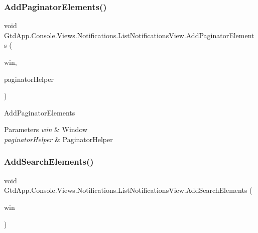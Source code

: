 \subsubsection{\texorpdfstring{Add\+Paginator\+Elements()}{AddPaginatorElements()}}
{\footnotesize\ttfamily void Gtd\+App.\+Console.\+Views.\+Notifications.\+List\+Notifications\+View.\+Add\+Paginator\+Elements (\begin{DoxyParamCaption}\item[{Window}]{win,  }\item[{\mbox{\hyperlink{class_gtd_app_1_1_console_core_1_1_views_1_1_helpers_1_1_paginator_helper}{Paginator\+Helper}}}]{paginator\+Helper }\end{DoxyParamCaption})\hspace{0.3cm}{\ttfamily [protected]}}



Add\+Paginator\+Elements 


\begin{DoxyParams}{Parameters}
{\em win} & Window\\
\hline
{\em paginator\+Helper} & Paginator\+Helper\\
\hline
\end{DoxyParams}
\mbox{\label{class_gtd_app_1_1_console_1_1_views_1_1_notifications_1_1_list_notifications_view_a9282b5c50f46f8a501f05420b8920e9e}} 
\subsubsection{\texorpdfstring{Add\+Search\+Elements()}{AddSearchElements()}}
{\footnotesize\ttfamily void Gtd\+App.\+Console.\+Views.\+Notifications.\+List\+Notifications\+View.\+Add\+Search\+Elements (\begin{DoxyParamCaption}\item[{Window}]{win }\end{DoxyParamCaption})\hspace{0.3cm}{\ttfamily [protected]}}



